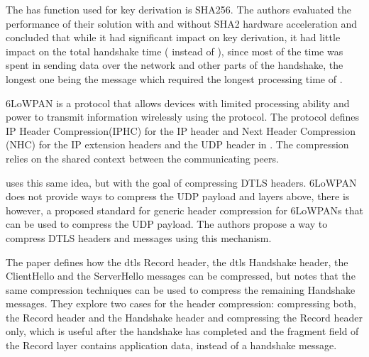 \documentclass{llncs}
\begin{document}
The has function used for key derivation is SHA256. The authors evaluated the
performance of their solution with and without SHA2 hardware acceleration and
concluded that while it had significant impact on key derivation, it had little
impact on the total handshake time ( instead of ), since most of the time was spent in sending
data over the network and other parts of the handshake, the longest one being
the  message which required the longest processing time
of .

6LoWPAN\cite{RFC4944} is a protocol that allows devices with limited processing
ability and power to transmit information wirelessly using the 
protocol. The protocol defines IP Header Compression(IPHC) for the IP header and
Next Header Compression (NHC) for the IP extension headers and the UDP header in \cite{RFC6282}.
The compression relies on the shared context between the communicating peers.

\cite{6LoWPANC53:online} uses this same idea, but with the goal of compressing DTLS headers.
6LoWPAN does not provide ways to compress the UDP payload and layers above, there
is however, a proposed standard\cite{RFC7400} for generic header compression
for 6LoWPANs that can be used to compress the UDP payload. The authors propose
a way to compress DTLS headers and messages using this mechanism.

The paper \cite{6LoWPANC53:online} defines how the \gls{dtls} Record header, the \gls{dtls} Handshake header,
the ClientHello and the ServerHello messages can be compressed, but notes that
the same compression techniques can be used to compress the remaining Handshake
messages. They explore two cases for the header compression: compressing both,
the Record header and the Handshake header and compressing the Record header only,
which is useful after the handshake has completed and the fragment field of the
Record layer contains application data, instead of a handshake message.
\end{document}
